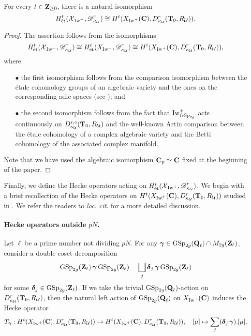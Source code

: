 \begin{Proposition}\label{Proposition: Comparison theorem of cohomologies}
For every $t\in \Z_{\geq 0}$, there is a natural isomorphism $$H_{\et}^t(\calX_{\Iw^+}, \scrD_{\kappa_{\calU}}^r)\cong H^t(X_{\Iw^+}(\C), D_{\kappa_{\calU}}^r(\T_0, R_{\calU})).$$\end{Proposition}
\begin{proof}
The assertion follows from the isomorphisms $$H_{\et}^t(\calX_{\Iw^+}, \scrD_{\kappa_{\calU}}^r)\cong H_{\et}^t(X_{\Iw^+}, \scrD_{\kappa_{\calU}}^r)\cong H^t(X_{\Iw^+}(\C), D_{\kappa_{\calU}}^r(\T_0, R_{\calU})),$$ where \begin{enumerate}
    \item[$\bullet$] the first isomorphism follows from the comparison isomorphism between the \'{e}tale cohomology groups of an algebraic variety and the ones on the corresponding adic spaces (see \cite[Theorem 3.8.1]{Huber-2013}); and
    \item[$\bullet$] the second isomorphism follows from the fact that $\Iw_{\GSp_{2g}}^+$ acts continuously on $D_{\kappa_{\calU}}^{r, \circ}(\T_0, R_{\calU})$ and the well-known Artin comparison between the \'{e}tale cohomology of a complex algebraic variety and the Betti cohomology of the associated complex manifold. 
\end{enumerate} Note that we have used the algebraic isomorphism $\C_p\simeq \C$ fixed at the beginning of the paper.
\end{proof}

Finally, we define the Hecke operators acting on $H_{\et}^t(\calX_{\Iw^+},\scrD_{\kappa_{\calU}}^r)$. We begin with a brief recollection of the Hecke operators on $H^t(X_{\Iw^+}(\C), D_{\kappa_{\calU}}^r(\T_0, R_{\calU}))$ studied in \cite{Hansen-PhD}. We refer the readers to \textit{loc. cit.} for a more detailed discussion.

\paragraph{Hecke operators outside $pN$.} Let $\ell$ be a prime number not dividing $pN$. For any $\bfgamma \in \GSp_{2g}(\Q_{\ell})\cap M_{2g}(\Z_{\ell})$, consider a double coset decomposition \[
    \GSp_{2g}(\Z_{\ell}) \bfgamma \GSp_{2g}(\Z_{\ell}) = \bigsqcup_j \bfdelta_{j}\bfgamma\GSp_{2g}(\Z_{\ell})
\] for some $\bfdelta_j\in \GSp_{2g}(\Z_{\ell})$. If we take the trivial $\GSp_{2g}(\Q_{\ell})$-action on $D_{\kappa_{\calU}}^r(\T_0, R_{\calU})$, then the natural left action of $\GSp_{2g}(\Q_{\ell})$ on $X_{\Iw^+}(\C)$ induces the Hecke operator 
\begin{equation}\label{eq: Hecke on coh. away from Np}
    T_{\bfgamma}: H^t(X_{\Iw^+}(\C), D_{\kappa_{\calU}}^r(\T_0, R_{\calU})) \rightarrow H^t(X_{\Iw^+}(\C), D_{\kappa_{\calU}}^r(\T_0, R_{\calU})), \quad [\mu]\mapsto \sum_{j} (\bfdelta_j\bfgamma) .  [\mu].
\end{equation}

